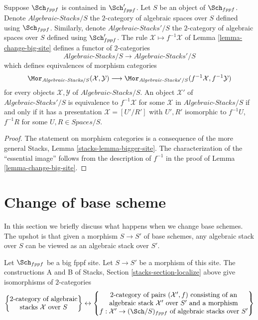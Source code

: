 \begin{lemma}
\label{lemma-fully-faithful}
Suppose $\Sch_{fppf}$ is contained in $\Sch'_{fppf}$.
Let $S$ be an object of $\Sch_{fppf}$. Denote
$\textit{Algebraic-Stacks}/S$ the $2$-category of algebraic spaces over $S$
defined using $\Sch_{fppf}$. Similarly, denote
$\textit{Algebraic-Stacks}'/S$ the $2$-category of algebraic spaces over $S$
defined using $\Sch'_{fppf}$. The rule
$\mathcal{X} \mapsto f^{-1}\mathcal{X}$ of
Lemma \ref{lemma-change-big-site}
defines a functor of $2$-categories
$$
\textit{Algebraic-Stacks}/S \longrightarrow \textit{Algebraic-Stacks}'/S
$$
which defines equivalences of morphism categories
$$
\Mor_{\textit{Algebraic-Stacks}/S}(\mathcal{X}, \mathcal{Y})
\longrightarrow
\Mor_{\textit{Algebraic-Stacks}'/S}(f^{-1}\mathcal{X}, f^{-1}\mathcal{Y})
$$
for every objects $\mathcal{X}, \mathcal{Y}$ of
$\textit{Algebraic-Stacks}/S$. An object
$\mathcal{X}'$ of $\textit{Algebraic-Stacks}'/S$
is equivalence to $f^{-1}\mathcal{X}$ for some
$\mathcal{X}$ in $\textit{Algebraic-Stacks}/S$
if and only if it has a presentation $\mathcal{X} = [U'/R']$
with $U', R'$ isomorphic to $f^{-1}U$, $f^{-1}R$ for some
$U, R \in \textit{Spaces}/S$.
\end{lemma}

\begin{proof}
The statement on morphism categories is a consequence of the more general
Stacks, Lemma \ref{stacks-lemma-bigger-site}.
The characterization of the ``essential image'' follows from the description
of $f^{-1}$ in the proof of
Lemma \ref{lemma-change-big-site}.
\end{proof}


\section{Change of base scheme}
\label{section-change-base-scheme}

\noindent
In this section we briefly discuss what happens when we change base schemes.
The upshot is that given a morphism $S \to S'$ of base schemes, any algebraic
stack over $S$ can be viewed as an algebraic stack over $S'$.

\begin{lemma}
\label{lemma-category-of-spaces-over-smaller-base-scheme}
Let $\Sch_{fppf}$ be a big fppf site.
Let $S \to S'$ be a morphism of this site.
The constructions A and B of
Stacks, Section \ref{stacks-section-localize}
above give isomorphisms of $2$-categories
$$
\left\{
\begin{matrix}
2\text{-category of algebraic}\\
\text{stacks }\mathcal{X}\text{ over }S
\end{matrix}
\right\}
\leftrightarrow
\left\{
\begin{matrix}
2\text{-category of pairs }(\mathcal{X}', f)\text{ consisting of an}\\
\text{algebraic stack }\mathcal{X}'\text{ over }S'\text{ and a morphism}\\
f : \mathcal{X}' \to (\Sch/S)_{fppf}\text{ of algebraic stacks over }S'
\end{matrix}
\right\}
$$
\end{lemma}

